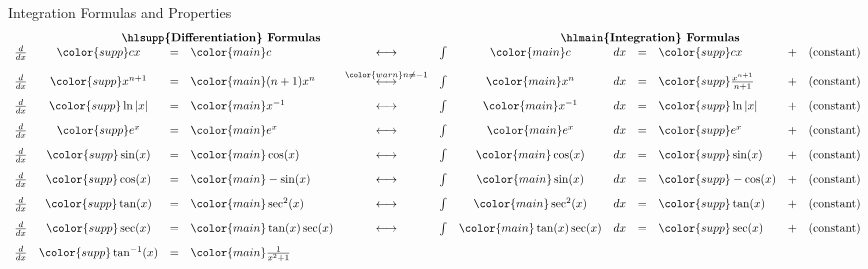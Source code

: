 \documentclass[../main.tex]{subfiles}
\begin{document}
\begin{lesson}{Integration Formulas and Properties}
  \[
    \begin{array}{rcclcrclllcl} 
      \multicolumn{5}{c}{\text{\textbf{\hlsupp{Differentiation} Formulas}}} & \multicolumn{7}{c}{\text{\textbf{\hlmain{Integration} Formulas}}} \\
      \frac{d}{dx} & {\color{supp} cx} &=& {\color{main} c}
                   & \longleftrightarrow 
                   & \int & {\color{main} c} & dx &=& {\color{supp} cx} 
                   &+& (\text{constant}) \\[2ex]
      \frac{d}{dx} & {\color{supp} x^{n+1}  } &=& {\color{main} (n+1) x^{n}}
                   & \overset{\color{warn} n \ne -1}{\longleftrightarrow}
                   & \int & {\color{main} x^{n}} & dx &=& {\color{supp} \frac{x^{n+1}}{n+1} } 
                   &+& (\text{constant}) \\[2ex]
      \frac{d}{dx} & {\color{supp} \ln|x| } &=& {\color{main} x^{-1}}
                   & \longleftrightarrow 
                   & \int & {\color{main} x^{-1}} & dx &=& {\color{supp} \ln|x|} 
                   &+& (\text{constant}) \\[2ex]
      \frac{d}{dx} & {\color{supp} e^{x}} &=& {\color{main} e^{x}}
                   & \longleftrightarrow
                   & \int & {\color{main} e^{x}      } & dx &=& {\color{supp} e^{x}} 
                   &+& (\text{constant}) \\[2ex]
      \frac{d}{dx} & {\color{supp} \sin(x)} &=& {\color{main} \cos(x)}
                   & \longleftrightarrow 
                   & \int & {\color{main} \cos(x)} & dx &=& {\color{supp} \sin(x)} 
                   &+& (\text{constant}) \\[2ex]
      \frac{d}{dx} & {\color{supp} \cos(x)} &=& {\color{main} -\sin(x)}
                   & \longleftrightarrow 
                   & \int & {\color{main} \sin(x)} & dx &=& {\color{supp} -\cos(x)} 
                   &+& (\text{constant}) \\[2ex]
      \frac{d}{dx} & {\color{supp} \tan(x)} &=& {\color{main} \sec^{2}(x)}
                   & \longleftrightarrow 
                   & \int & {\color{main} \sec^{2}(x)} & dx &=& {\color{supp} \tan(x)} 
                   &+& (\text{constant}) \\[2ex]
      \frac{d}{dx} & {\color{supp} \sec(x)} &=& {\color{main} \tan(x)\sec(x)}
                   & \longleftrightarrow 
                   & \int & {\color{main} \tan(x)\sec(x)} & dx &=& {\color{supp} \sec(x)} 
                   &+& (\text{constant}) \\[2ex]
      \frac{d}{dx} & {\color{supp} \arctan(x)} &=& {\color{main} \frac{1}{x^{2}+1}}

\end{array}\]
\end{lesson}
\end{document}
